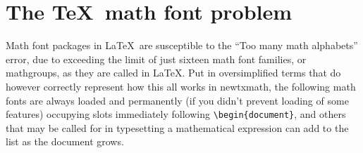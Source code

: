 \documentclass[\fsc]{article}
\theoremstyle{oldplain}
\theoremstyle{plain}
\begin{document}
\section{The \TeX\ math font problem}
Math font packages in \LaTeX\ are susceptible to the ``Too many math alphabets'' error, due to exceeding the limit of just sixteen math font families, or mathgroups, as they are called in \LaTeX. Put in oversimplified terms that do however correctly represent how this all works in \textsf{newtxmath}, the following math fonts are always loaded and permanently (if you didn't prevent loading of some features) occupying slots immediately following \verb|\begin{document}|, and others that may be called for in typesetting a mathematical expression can add to the list as the document grows.
\end{document}
